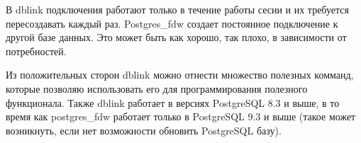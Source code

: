 В dblink подключения работают только в течение работы сесии и их требуется пересоздавать каждый раз. Postgres\_fdw создает постоянное подключение к другой базе данных. Это может быть как хорошо, так плохо, в зависимости от потребностей.

Из положительных сторон dblink можно отнести множество полезных комманд, которые позволяю использовать его для программирования полезного функционала. Также dblink работает в версиях PostgreSQL 8.3 и выше, в то время как postgres\_fdw работает только в PostgreSQL 9.3 и выше (такое может возникнуть, если нет возможности обновить PostgreSQL базу).
